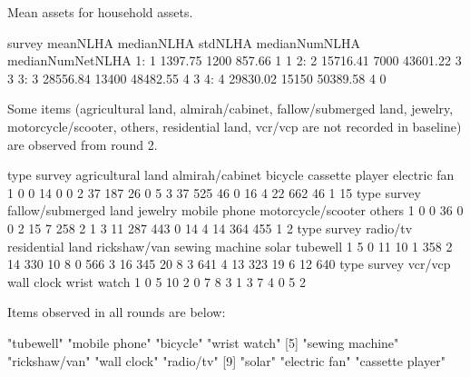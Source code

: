 Mean assets for household assets.
\begin{Schunk}
\begin{Soutput}
   survey meanNLHA medianNLHA  stdNLHA medianNumNLHA medianNumNetNLHA
1:      1  1397.75       1200   857.66             1                1
2:      2 15716.41       7000 43601.22             3                3
3:      3 28556.84      13400 48482.55             4                3
4:      4 29830.02      15150 50389.58             4                0
\end{Soutput}
\end{Schunk}
Some items (agricultural land, almirah/cabinet, fallow/submerged land, jewelry, motorcycle/scooter, others, residential land, vcr/vcp are not recorded in baseline) are observed from round 2. 
\begin{Schunk}
\begin{Soutput}
      type
survey agricultural land almirah/cabinet bicycle cassette player electric fan
     1                 0               0      14               0            0
     2                37             187      26               0            5
     3                37             525      46               0           16
     4                22             662      46               1           15
      type
survey fallow/submerged land jewelry mobile phone motorcycle/scooter others
     1                     0       0           36                  0      0
     2                    15       7          258                  2      1
     3                    11     287          443                  0     14
     4                    14     364          455                  1      2
      type
survey radio/tv residential land rickshaw/van sewing machine solar tubewell
     1        5                0           11             10     1      358
     2       14              330           10              8     0      566
     3       16              345           20              8     3      641
     4       13              323           19              6    12      640
      type
survey vcr/vcp wall clock wrist watch
     1       0          5          10
     2       0          7           8
     3       1          3           7
     4       0          5           2
\end{Soutput}
\end{Schunk}
Items observed in all rounds are below:
\begin{Schunk}
\begin{Soutput}
 [1] "tubewell"        "mobile phone"    "bicycle"         "wrist watch"    
 [5] "sewing machine"  "rickshaw/van"    "wall clock"      "radio/tv"       
 [9] "solar"           "electric fan"    "cassette player"
\end{Soutput}
\end{Schunk}
